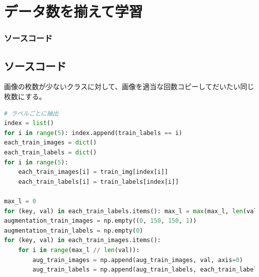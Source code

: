 \documentclass[leno,xcolor=dvipsnames]{beamer}
\begin{document}
  \section{データ数を揃えて学習}
  \begin{frame}[fragile]
    \frametitle{ソースコード}
    \subsection{ソースコード}
    画像の枚数が少ないクラスに対して、画像を適当な回数コピーしてだいたい同じ枚数にする。
    \begin{lstlisting}[caption=augmentation.py, language=Python]
# ラベルごとに抽出
index = list()
for i in range(5): index.append(train_labels == i)
each_train_images = dict()
each_train_labels = dict()
for i in range(5):
    each_train_images[i] = train_img[index[i]]
    each_train_labels[i] = train_labels[index[i]]

max_l = 0
for (key, val) in each_train_labels.items(): max_l = max(max_l, len(val))
augmentation_train_images = np.empty((0, 150, 150, 1))
augmentation_train_labels = np.empty(0)
for (key, val) in each_train_images.items():
    for i in range(max_l // len(val)):
        aug_train_images = np.append(aug_train_images, val, axis=0)
        aug_train_labels = np.append(aug_train_labels, each_train_labels[key])
    \end{lstlisting}
  \end{frame}
\end{document}
